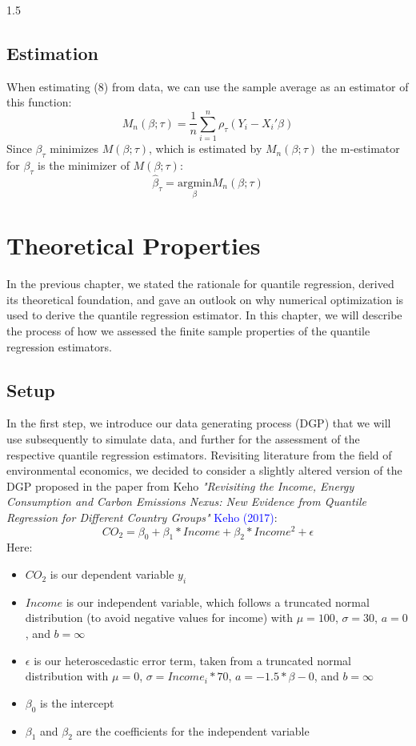 \documentclass[conference]{IEEEtran}
\begin{document}
\begin{spacing}{1.5}
\subsection{\textbf{Estimation}}

When estimating (8) from data, we can use the sample average as an estimator of this function:
\begin{equation}
M_{n}(\beta ; \tau) = \frac{1}{n} \sum_{i = 1}^{n} \rho_{\tau} (Y_{i} - X_{i}' \beta)
\end{equation}
Since $\beta_{\tau}$ minimizes $M(\beta ; \tau)$, which is estimated by $M_{n}(\beta ; \tau)$ the m-estimator for $\beta_{\tau}$ is the minimizer of $M(\beta ; \tau)$:
\begin{equation}
\hat{\beta}_{\tau} = \underset{\beta}{\mathrm{argmin}} M_{n}(\beta ; \tau)
\end{equation}

\section{\textbf{Theoretical Properties}}
In the previous chapter, we stated the rationale for quantile regression, derived its theoretical foundation, and gave an outlook on why numerical optimization is used to derive the quantile regression estimator.
In this chapter, we will describe the process of how we assessed the finite sample properties of the quantile regression estimators.

\subsection{\textbf{Setup}}
In the first step, we introduce our data generating process (DGP) that we will use subsequently to simulate data, and further for the assessment of the respective quantile regression estimators.
Revisiting literature from the field of environmental economics, we decided to consider a slightly altered version of the DGP proposed in the paper from Keho \textit{"Revisiting the Income, Energy Consumption and Carbon Emissions Nexus: New Evidence from Quantile Regression for Different Country Groups"} \textcolor{blue}{Keho (2017)}:
\begin{equation}
CO_{2} {=} \beta_{0} + \beta_{1} * Income + \beta_{2} * Income^{2} + \epsilon
\end{equation}
Here:
\begin{itemize}
\item $CO_{2}$ is our dependent variable $y_{i}$
\item $Income$ is our independent variable, which follows a truncated normal distribution (to avoid negative values for income) with $\mu = 100$, $\sigma = 30$, $a = 0$, and $b = \infty$
\item $\epsilon$ is our heteroscedastic error term, taken from a truncated normal distribution with  $\mu = 0$, 	$\sigma = Income_{i}*70$, $a=-1.5*\beta-{0}$, and $b = \infty$
\item $\beta_{0}$ is the intercept
\item $\beta_{1}$ and $\beta_{2}$ are the coefficients for the independent variable
\end{itemize}


\end{spacing}
\end{document}
